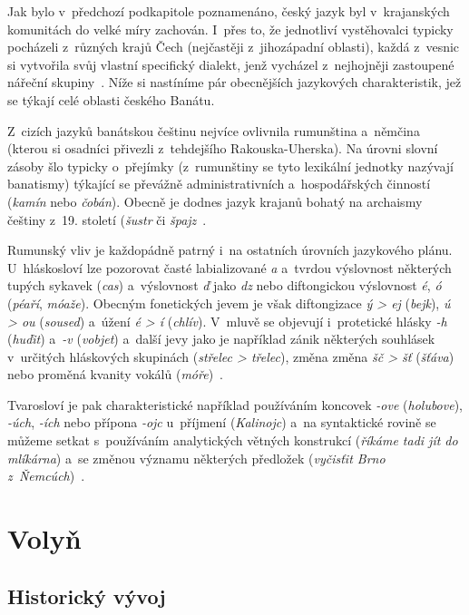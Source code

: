 Jak bylo v~předchozí podkapitole poznamenáno, český jazyk byl v~krajanských komunitách do velké míry zachován. I~přes to, že jednotliví vystěhovalci typicky pocházeli z~různých krajů Čech (nejčastěji z~jihozápadní oblasti), každá z~vesnic si vytvořila svůj vlastní specifický dialekt, jenž vycházel z~nejhojněji zastoupené nářeční skupiny~\parencite{Gecse2013}. Níže si nastíníme pár obecnějších jazykových charakteristik, jež se týkají celé oblasti českého Banátu.

Z~cizích jazyků banátskou češtinu nejvíce ovlivnila rumunština a~němčina (kterou si osadníci přivezli z~tehdejšího Rakouska-Uherska). Na úrovni slovní zásoby šlo typicky o~přejímky (z~rumunštiny se tyto lexikální jednotky nazývají banatismy) týkající se převážně administrativních a~hospodářských činností (\emph{kamín} nebo \emph{čobán}). Obecně je dodnes jazyk krajanů bohatý na archaismy češtiny z~19. století (\emph{šustr} či \emph{špajz}~\parencite{Frnochova2012}.

Rumunský vliv je každopádně patrný i~na ostatních úrovních jazykového plánu. U~hláskosloví lze pozorovat časté labializované \emph{a} a~tvrdou výslovnost některých tupých sykavek (\emph{cas}) a~výslovnost \emph{ď }jako \emph{dz} nebo diftongickou výslovnost \emph{é}, \emph{ó} (\emph{péaří}, \emph{móaže}). Obecným fonetických jevem je však diftongizace \emph{ý \textgreater{} ej} (\emph{bejk}), \emph{ú \textgreater{} ou} (\emph{soused}) a~úžení \emph{é \textgreater{} í} (\emph{chlív}). V~mluvě se objevují i~protetické hlásky \emph{-h} (\emph{huďit}) a~\emph{-v} (\emph{vobjet}) a~další jevy jako je například zánik některých souhlásek v~určitých hláskových skupinách (\emph{střelec \textgreater{} třelec}), změna změna \emph{šč \textgreater{} šť} (\emph{šťáva}) nebo proměná kvanity vokálů (\emph{móře})~\parencite{Skulina1976}.

Tvarosloví je pak charakteristické například používáním koncovek \emph{-ove} (\emph{holubove}), \emph{-úch}, \emph{-ích} nebo přípona \emph{-ojc} u~příjmení (\emph{Kalinojc}) a~na syntaktické rovině se můžeme setkat s~používáním analytických větných konstrukcí (\emph{říkáme tadi jít do mlíkárna}) a~se změnou významu některých předložek (\emph{vyčisťit Brno z~Ňemcúch})~\parencite{Skulina1976}.

\hypertarget{volyux148}{%
\section{Volyň}\label{volyux148}}

\hypertarget{historickuxfd-vuxfdvoj-1}{%
\subsection*{Historický vývoj}\label{historickuxfd-vuxfdvoj-1}}

